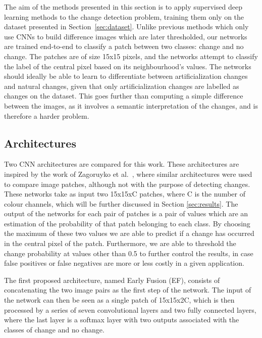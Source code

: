 \documentclass{article}
\begin{document}
The aim of the methods presented in this section is to apply supervised deep learning methods to the change detection problem, training them only on the dataset presented in Section~\ref{sec:dataset}. Unlike previous methods which only use CNNs to build difference images which are later thresholded, our networks are trained end-to-end to classify a patch between two classes: change and no change. The patches are of size 15x15 pixels, and the networks attempt to classify the label of the central pixel based on its neighbourhood's values. The networks should ideally be able to learn to differentiate between artificialization changes and natural changes, given that only artificialization changes are labelled as changes on the dataset. This goes further than computing a simple difference between the images, as it involves a semantic interpretation of the changes, and is therefore a harder problem. 

\subsection{Architectures}
\label{ssec:cd-esc}

Two CNN architectures are compared for this work. These architectures are inspired by the work of Zagoruyko et al.~\cite{zagoruyko2015learning}, where similar architectures were used to compare image patches, although not with the purpose of detecting changes.
These networks take as input two 15x15xC patches, where C is the number of colour channels, which will be further discussed in Section \ref{sec:results}. The output of the networks for each pair of patches is a pair of values which are an estimation of the probability of that patch belonging to each class. By choosing the maximum of these two values we are able to predict if a change has occurred in the central pixel of the patch. Furthermore, we are able to threshold the change probability at values other than 0.5 to further control the results, in case false positives or false negatives are more or less costly in a given application.

The first proposed architecture, named Early Fusion (EF), consists of concatenating the two image pairs as the first step of the network. The input of the network can then be seen as a single patch of 15x15x2C, which is then processed by a series of seven convolutional layers and two fully connected layers, where the last layer is a softmax layer with two outputs associated with the classes of change and no change.
\end{document}
